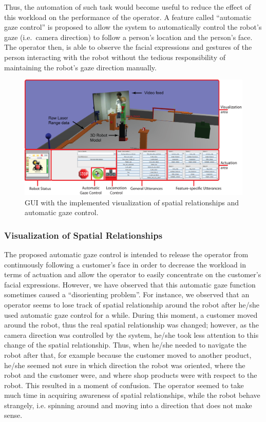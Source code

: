 \documentclass[journal]{IEEEtran}
\begin{document}
Thus, the automation of such task would become useful to reduce the effect of this workload on the performance of the operator.
A feature called ``automatic gaze control'' is proposed to allow the system to automatically control the robot's gaze (i.e.\ camera direction) to follow a person's location and the person's face.
The operator then, is able to observe the facial expressions and gestures of the person interacting with the robot without the tedious responsibility of maintaining the robot's gaze direction manually.
\begin{figure}[htp]
\centering
\includegraphics[width=2\columnwidth]{figs/fullFeatureGUIFinal_2.eps}
\caption{GUI with the implemented visualization of spatial relationships and automatic gaze control.}
\label{fig:fullFeatureGUI}
\end{figure}


\subsubsection{Visualization of Spatial Relationships}
The proposed automatic gaze control is intended to release the operator from continuously following a customer's face in order to decrease the workload in terms of actuation and allow the operator to easily concentrate on the customer's facial expressions.
However, we have observed that this automatic gaze function sometimes caused a ``disorienting problem''. 
For instance, we observed that an operator seems to lose track of spatial relationship around the robot after he/she used automatic gaze control for a while. 
During this moment, a customer moved around the robot, thus the real spatial relationship was changed; however, as the camera direction was controlled by the system, he/she took less attention to this change of the spatial relationship.
Thus, when he/she needed to navigate the robot after that, for example because the customer moved to another product, he/she seemed not sure in which direction the robot was oriented, where the robot and the customer were, and where shop products were with respect to the robot. 
This resulted in a moment of confusion. 
The operator seemed to take much time in acquiring awareness of spatial relationships, while the robot behave strangely, i.e. spinning around and moving into a direction that does not make sense.
\end{document}
